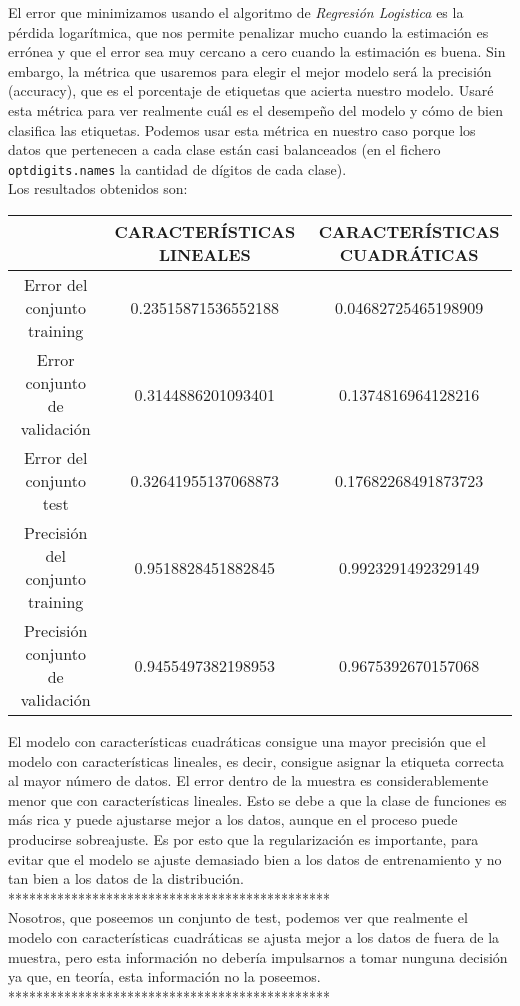 \documentclass{article}
\begin{document}
El error que minimizamos usando el algoritmo de \textit{Regresión Logistica} es la pérdida logarítmica, que nos permite penalizar mucho cuando la estimación es errónea y que el error sea muy cercano a cero cuando la estimación es buena. Sin embargo, la métrica que usaremos para elegir el mejor modelo será la precisión (accuracy), que es el porcentaje de etiquetas que acierta nuestro modelo. Usaré esta métrica para ver realmente cuál es el desempeño del modelo y cómo de bien clasifica las etiquetas. Podemos usar esta métrica en nuestro caso porque los datos que pertenecen a cada clase están casi balanceados (en el fichero \texttt{optdigits.names} la cantidad de dígitos de cada clase).\\

Los resultados obtenidos son:

\begin{center}
\begin{tabular}{|c|c|c|}
\hline
\multicolumn{1}{|c|}{}& \textbf{CARACTERÍSTICAS LINEALES} &
\textbf{CARACTERÍSTICAS CUADRÁTICAS}  \\ \hline
  Error del conjunto training       & 0.23515871536552188 & 0.04682725465198909 \\
  Error conjunto de validación      & 0.3144886201093401  & 0.1374816964128216 \\
  Error del conjunto test           & 0.32641955137068873 & 0.17682268491873723 \\
  Precisión del conjunto training   & 0.9518828451882845  & 0.9923291492329149 \\
  Precisión conjunto de validación  & 0.9455497382198953  & 0.9675392670157068 \\ \hline
\end{tabular}
\end{center}

El modelo con características cuadráticas consigue una mayor precisión que el modelo con características lineales, es decir, consigue asignar la etiqueta correcta al mayor número de datos. El error dentro de la muestra es considerablemente menor que con características lineales. Esto se debe a que la clase de funciones es más rica y puede ajustarse mejor a los datos, aunque en el proceso puede producirse sobreajuste. Es por esto que la regularización es importante, para evitar que el modelo se ajuste demasiado bien a los datos de entrenamiento y no tan bien a los datos de la distribución.\\

                    **********************************************\\
Nosotros, que poseemos un conjunto de test, podemos ver que realmente el modelo con características cuadráticas se ajusta mejor a los datos de fuera de la muestra, pero esta información no debería impulsarnos a tomar nunguna decisión ya que, en teoría, esta información no la poseemos.\\
                    **********************************************\\
\end{document}
